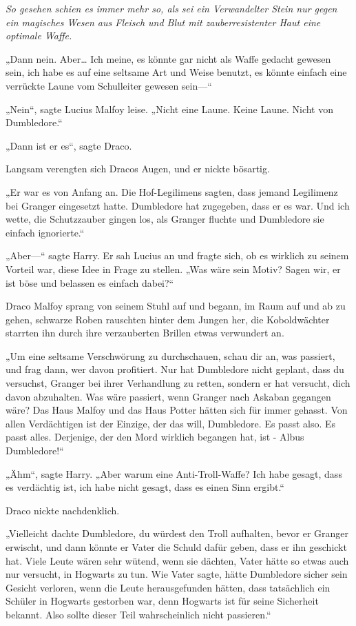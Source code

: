 {\emph{So gesehen schien es immer mehr so, als sei ein Verwandelter Stein nur gegen ein magisches Wesen aus Fleisch und Blut mit zauberresistenter Haut eine optimale Waffe.}

„Dann nein. Aber… Ich meine, es könnte gar nicht als Waffe gedacht gewesen sein, ich habe es auf eine seltsame Art und Weise benutzt, es könnte einfach eine verrückte Laune vom Schulleiter gewesen sein—“

„Nein“, sagte Lucius Malfoy leise. „Nicht eine Laune. Keine Laune. Nicht von Dumbledore.“

„Dann ist er es“, sagte Draco.

Langsam verengten sich Dracos Augen, und er nickte bösartig.

„Er war es von Anfang an. Die Hof-Legilimens sagten, dass jemand Legilimenz bei Granger eingesetzt hatte. Dumbledore hat zugegeben, dass er es war. Und ich wette, die Schutzzauber gingen los, als Granger fluchte und Dumbledore sie einfach ignorierte.“

„Aber—“ sagte Harry. Er sah Lucius an und fragte sich, ob es wirklich zu seinem Vorteil war, diese Idee in Frage zu stellen. „Was wäre sein Motiv? Sagen wir, er ist böse und belassen es einfach dabei?“

Draco Malfoy sprang von seinem Stuhl auf und begann, im Raum auf und ab zu gehen, schwarze Roben rauschten hinter dem Jungen her, die Koboldwächter starrten ihn durch ihre verzauberten Brillen etwas verwundert an.

„Um eine seltsame Verschwörung zu durchschauen, schau dir an, was passiert, und frag dann, wer davon profitiert. Nur hat Dumbledore nicht geplant, dass du versuchst, Granger bei ihrer Verhandlung zu retten, sondern er hat versucht, dich davon abzuhalten. Was wäre passiert, wenn Granger nach Askaban gegangen wäre? Das Haus Malfoy und das Haus Potter hätten sich für immer gehasst. Von allen Verdächtigen ist der Einzige, der das will, Dumbledore. Es passt also. Es passt alles. Derjenige, der den Mord wirklich begangen hat, ist - Albus Dumbledore!“

„Ähm“, sagte Harry. „Aber warum eine Anti-Troll-Waffe? Ich habe gesagt, dass es verdächtig ist, ich habe nicht gesagt, dass es einen Sinn ergibt.“

Draco nickte nachdenklich.

„Vielleicht dachte Dumbledore, du würdest den Troll aufhalten, bevor er Granger erwischt, und dann könnte er Vater die Schuld dafür geben, dass er ihn geschickt hat. Viele Leute wären sehr wütend, wenn sie dächten, Vater hätte so etwas auch nur versucht, in Hogwarts zu tun. Wie Vater sagte, hätte Dumbledore sicher sein Gesicht verloren, wenn die Leute herausgefunden hätten, dass tatsächlich ein Schüler in Hogwarts gestorben war, denn Hogwarts ist für seine Sicherheit bekannt. Also sollte dieser Teil wahrscheinlich nicht passieren.“

}
